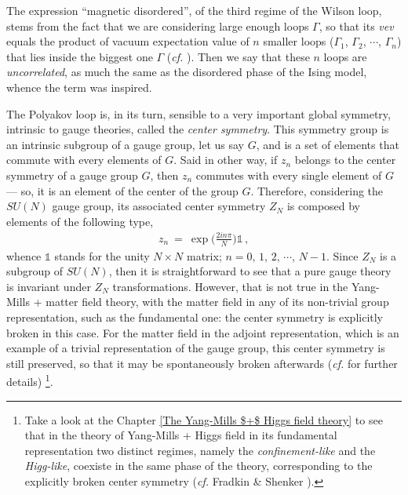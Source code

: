 \begin{itemize}
The expression ``magnetic disordered'', of the third regime of the Wilson loop, stems from the
fact that we are considering large enough loops $\Gamma$, so that its \emph{vev} equals the
product of vacuum expectation value of $n$ smaller loops ($\Gamma_{1}$, $\Gamma_{2}$, $\cdots$,
$\Gamma_{n}$) that lies inside the biggest one $\Gamma$ (\emph{cf.} \cite{Greensite:2011zz}).
Then we say that these $n$ loops are \emph{uncorrelated}, as much the same as the disordered
phase of the Ising model, whence the term was inspired.
\end{itemize}

The Polyakov loop \cite{Polyakov:1978vu} is, in its turn, sensible to a very important global
symmetry, intrinsic to gauge theories, called the \emph{center symmetry}. This symmetry group
is an intrinsic subgroup of a gauge group, let us say $G$, and is a set of elements that
commute with every elements of $G$. Said in other way, if $z_{n}$ belongs to the center
symmetry of a gauge group $G$, then $z_{n}$ commutes with every single element of $G$ --- so,
it is an element of the center of the group $G$. Therefore, considering the $SU(N)$ gauge
group, its associated center symmetry $Z_{N}$ is composed by elements of the following type,
\cite{Greensite:2011zz,Fukushima:2003fw,Fukushima:thesis}
\begin{eqnarray}
z_{n} ~=~ \exp\biggl( \frac{2i n\pi}{N} \biggr)\mathbb{1}\,,
\end{eqnarray}
whence $\mathbb{1}$ stands for the unity $N\times N$ matrix; $n = 0,\,1,\,2,\,\cdots,\,N-1$.
Since $Z_{N}$ is a subgroup of $SU(N)$, then it is straightforward to see that a pure gauge
theory is invariant under $Z_{N}$ transformations. However, that is not true in the Yang-Mills
+ matter field theory, with the matter field in any of its non-trivial group representation,
such as the fundamental one: the center symmetry is explicitly broken in this case. For the
matter field in the adjoint representation, which is an example of a trivial representation of
the gauge group, this center symmetry is still preserved, so that it may be spontaneously
broken afterwards (\emph{cf.} \cite{Greensite:2011zz} for further details) \footnote{Take
a look at the Chapter \ref{The Yang-Mills $+$ Higgs field theory} to see that in the theory of
Yang-Mills + Higgs field in its fundamental representation two distinct regimes, namely
the \emph{confinement-like} and the \emph{Higg-like}, coexiste in the same phase of the
theory, corresponding to the explicitly broken center symmetry (\emph{cf.} Fradkin \& Shenker
\cite{Fradkin:1978dv}).}.

